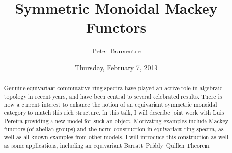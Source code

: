 \documentclass{UAmathtalk}
\author{Peter Bonventre}
\title{Symmetric Monoidal Mackey Functors}
\date{Thursday, February 7, 2019}
\begin{document}
\maketitle

\begin{abstract}
Genuine equivariant commutative ring spectra have played an active role in algebraic topology in recent years, and have been central to several celebrated results. There is now a current interest to enhance the notion of an equivariant symmetric monoidal category to match this rich structure. In this talk, I will describe joint work with Luis Pereira providing a new model for such an object. Motivating examples include Mackey functors (of abelian groups) and the norm construction in equivariant ring spectra, as well as all known examples from other models. I will introduce this construction as well as some applications, including an equivariant Barratt--Priddy--Quillen Theorem.
\end{abstract}
\end{document}
